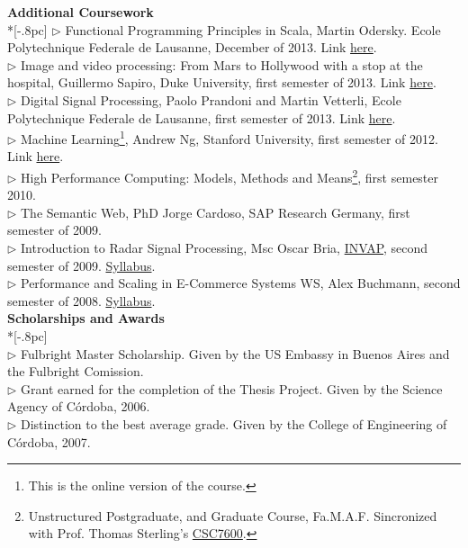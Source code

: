 \documentclass[letter,11pt,english]{article}
\begin{document}
{\large \bf Additional Coursework}\\ *[-.8pc]
\underline{\hspace{6in}}
$\triangleright$ Functional Programming Principles in Scala,  Martin Odersky. Ecole Polytechnique Federale de Lausanne, December of 2013. Link \href{https://www.coursera.org/course/progfun}{here}. \\
$\triangleright$ Image and video processing: From Mars to Hollywood with a stop at the hospital, Guillermo Sapiro, Duke University, first semester of 2013. Link \href{https://www.coursera.org/course/images}{here}. \\
$\triangleright$ Digital Signal Processing, Paolo Prandoni and Martin Vetterli, Ecole Polytechnique Federale de Lausanne, first semester of 2013. Link \href{https://www.coursera.org/course/dsp}{here}. \\
$\triangleright$ Machine Learning\footnote{This is the online version of the course.}, Andrew Ng, Stanford University, first semester of 2012. Link \href{http://www.ml-class.org}{here}. \\
$\triangleright$ High Performance Computing: Models, Methods and Means\footnote{Unstructured Postgraduate,
and Graduate Course, Fa.M.A.F. Sincronized with Prof. Thomas Sterling's 
\href{http://www.csc.lsu.edu/Internal_review/2009/Syllabus_CSC_7600_HPC_2008.pdf}{CSC7600}.}, first semester 2010.\\
$\triangleright$ The Semantic Web, PhD Jorge Cardoso, SAP Research Germany, first semester of 2009.\\
$\triangleright$ Introduction to Radar Signal Processing, Msc Oscar Bria, 
\href{http://www.invap.net/index-e.php}{INVAP}, second semester of 2009. \href{http://postgrado.info.unlp.edu.ar/Cursos/Cursos/11-2011_Introduccion_al_Procesamiento_de_Senales_Radar.pdf}{Syllabus}.\\
$\triangleright$ Performance and Scaling in E-Commerce Systems WS, Alex Buchmann, second semester of 2008. 
\href{http://www.dvs.tu-darmstadt.de/teaching/perf/2008/}{Syllabus}.\\


{\bf Scholarships and Awards} \\*[-.8pc]
\underline{\hspace{6in}} \\
$\triangleright$ Fulbright Master Scholarship.
Given by the US Embassy in Buenos Aires and the Fulbright Comission.\\ 
$\triangleright$ Grant earned for the completion of the Thesis Project.
Given by the Science Agency of C\'ordoba, 2006.\\ 
$\triangleright$ Distinction to the best average grade.
Given by the College of Engineering of C\'ordoba, 2007.\\
\end{document}
